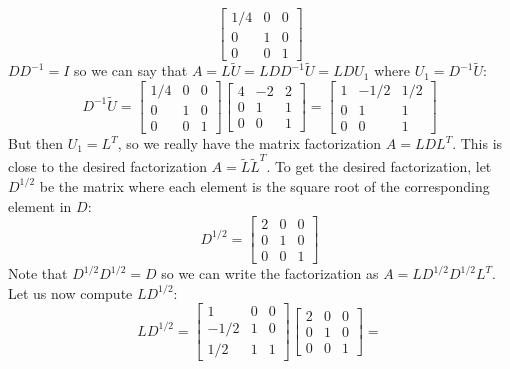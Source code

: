 \documentclass[11pt]{article}
\begin{document}
\begin{exercise}{4}
{$$\begin{bmatrix}
            1/4 & 0 & 0 \\
            0 & 1 & 0 \\
            0 & 0 & 1
        \end{bmatrix}
        $$
        $D D^{-1} = I$ so we can say that $A = L \tilde{U} = L D D^{-1} \tilde{U} = L D U_1$ where $U_1 = D^{-1} \tilde{U}$:
        $$ D^{-1} \tilde{U} =
        \begin{bmatrix}
            1/4 & 0 & 0 \\
            0 & 1 & 0 \\
            0 & 0 & 1
        \end{bmatrix}
        \begin{bmatrix}
            4 & -2 & 2 \\
            0 & 1 & 1 \\
            0 & 0 & 1
        \end{bmatrix}
        =
        \begin{bmatrix}
            1 & -1/2 & 1/2 \\
            0 & 1 & 1 \\
            0 & 0 & 1
        \end{bmatrix}
        $$
        But then $U_1 = L^T$, so we really have the matrix factorization $A = L D L^T$.
        This is close to the desired factorization $A = \tilde{L} \tilde{L}^T$.
        To get the desired factorization, let $D^{1/2}$ be the matrix where each element is the square root of the corresponding element in $D$:
        $$D^{1/2} =
        \begin{bmatrix}
            2 & 0 & 0 \\
            0 & 1 & 0 \\
            0 & 0 & 1
        \end{bmatrix}
        $$
        Note that $D^{1/2} D^{1/2} = D$ so we can write the factorization as $A = L D^{1/2} D^{1/2} L^T$.
        Let us now compute $L D^{1/2}$:
        $$ L D^{1/2} =
        \begin{bmatrix}
            1 & 0 & 0 \\
            -1/2 & 1 & 0 \\
            1/2 & 1 & 1
        \end{bmatrix}
        \begin{bmatrix}
            2 & 0 & 0 \\
            0 & 1 & 0 \\
            0 & 0 & 1
        \end{bmatrix}
        =
$$}
\end{exercise}
\end{document}
